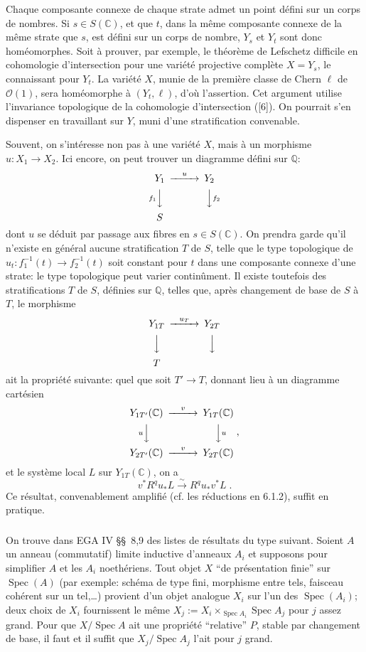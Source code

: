 \documentclass[12pt,a4paper]{article}
\theoremstyle{plain}
\theoremstyle{definition}
\theoremstyle{remark}
\DeclareMathOperator{\Spec}{Spec}
\newcommand{\CC}{\mathbb{C}}
\newcommand{\QQ}{\mathbb{Q}}
\newcommand{\cO}{\mathcal{O}}
\begin{document}
Chaque composante connexe de chaque strate admet un point d\'efini sur un corps de nombres. Si $s \in S(\CC)$, et que $t$, dans la m\^eme composante connexe de la m\^eme strate que $s$, est d\'efini sur un corps de nombre, $Y_s$ et $Y_t$ sont donc hom\'eomorphes. Soit \`a prouver, par exemple, le th\'eor\`eme de Lefschetz difficile en cohomologie d'intersection pour une vari\'et\'e projective compl\`ete $X = Y_s$, le connaissant pour $Y_t$. La vari\'et\'e $X$, munie de la premi\`ere classe de Chern $\ell$ de $\cO(1)$, sera hom\'eomorphe \`a $(Y_t, \ell)$, d'o\`u l'assertion. Cet argument utilise l'invariance topologique de la cohomologie d'intersection ([6]). On pourrait s'en dispenser en travaillant sur $Y$, muni d'une stratification convenable.

Souvent, on s'int\'eresse non pas \`a une vari\'et\'e $X$, mais \`a un morphisme $u: X_1 \to X_2$. Ici encore, on peut trouver un diagramme d\'efini sur $\QQ$:
\[
\begin{CD}
Y_1 @>{u}>> Y_2 \\
@V{f_1}VV @VV{f_2}V \\
S
\end{CD}
\]
dont $u$ se d\'eduit par passage aux fibres en $s \in S(\CC)$. On prendra garde qu'il n'existe en g\'en\'eral aucune stratification $T$ de $S$, telle que le type topologique de $u_t: f_1^{-1}(t) \to f_2^{-1}(t)$ soit constant pour $t$ dans une composante connexe d'une strate: le type topologique peut varier contin\^ument. Il existe toutefois des stratifications $T$ de $S$, d\'efinies sur $\QQ$, telles que, apr\`es changement de base de $S$ \`a $T$, le morphisme
\[
\begin{CD}
Y_{1T} @>{u_T}>> Y_{2T} \\
@VVV @VVV \\
T
\end{CD}
\]
ait la propri\'et\'e suivante: quel que soit $T' \to T$, donnant lieu \`a un diagramme cart\'esien
\[
\begin{CD}
Y_{1T'}(\CC) @>{v}>> Y_{1T}(\CC) \\
@V{u}VV @VV{u}V \\
Y_{2T'}(\CC) @>{v}>> Y_{2T}(\CC)
\end{CD}\;,
\]
et le syst\`eme local $L$ sur $Y_{1T}(\CC)$, on a
\[
v^*R^qu_*L \xrightarrow{\sim} R^qu_*v^*L\;.
\]
Ce r\'esultat, convenablement amplifi\'e (cf. les r\'eductions en 6.1.2), suffit en pratique.

\subsubsection{}
On trouve dans EGA IV \S\S\ 8,9 des listes de r\'esultats du type suivant. Soient $A$ un anneau (commutatif) limite inductive d'anneaux $A_i$ et supposons pour simplifier $A$ et les $A_i$ noeth\'eriens. Tout objet $X$ ``de pr\'esentation finie'' sur $\Spec(A)$ (par exemple: sch\'ema de type fini, morphisme entre tels, faisceau coh\'erent sur un tel,\ldots) provient d'un objet analogue $X_i$ sur l'un des $\Spec(A_i)$; deux choix de $X_i$ fournissent le m\^eme $X_j := X_i \times_{\Spec A_i} \Spec A_j$ pour $j$ assez grand. Pour que $X/\Spec A$ ait une propri\'et\'e ``relative'' $P$, stable par changement de base, il faut et il suffit que $X_j/\Spec A_j$ l'ait pour $j$ grand.
\end{document}
